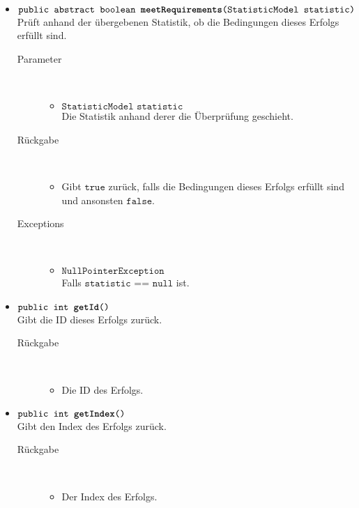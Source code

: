 \begin{description}
\begin{itemize}
		\item $\texttt{public abstract boolean \textbf{meetRequirements}(StatisticModel statistic)}$ \\ Prüft anhand der übergebenen Statistik, ob die Bedingungen dieses Erfolgs erfüllt sind.
		\begin{description}
		\item[Parameter] \hfill \\
			\vspace{-.8cm}
			\begin{itemize}
				\item $\texttt{StatisticModel statistic}$ \\ Die Statistik anhand derer die Überprüfung geschieht. 
			\end{itemize}
			\item[Rückgabe] \hfill \\
			\vspace{-.8cm}
			\begin{itemize}
				\item Gibt $\texttt{true}$ zurück, falls die Bedingungen dieses Erfolgs erfüllt sind und ansonsten $\texttt{false}$.
			\end{itemize}
			\item[Exceptions] \hfill \\
			\vspace{-.8cm}
			\begin{itemize}
				\item $\texttt{NullPointerException}$ \\ Falls $\texttt{statistic == null}$ ist.
			\end{itemize}
		\end{description}
		
		\item $\texttt{public int \textbf{getId}()}$ \\ Gibt die ID dieses Erfolgs zurück.
		\begin{description}
			\item[Rückgabe] \hfill \\
			\vspace{-.8cm}
			\begin{itemize}
				\item Die ID des Erfolgs.
			\end{itemize}
		\end{description}

\item $\texttt{public int \textbf{getIndex}()}$ \\ Gibt den Index des Erfolgs zurück.
		\begin{description}
			\item[Rückgabe] \hfill \\
			\vspace{-.8cm}
			\begin{itemize}
				\item Der Index des Erfolgs.
			\end{itemize}
		\end{description}


\end{itemize}
\end{description}
